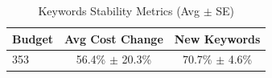 \begin{table}[htbp]
\centering
\caption{Keywords Stability Metrics (Avg $\pm$ SE)}
\begin{tabular}{lcc}
\toprule
Budget & Avg Cost Change & New Keywords \\
\midrule
353 & 56.4\% $\pm$ 20.3\% & 70.7\% $\pm$ 4.6\% \\
\bottomrule
\end{tabular}
\end{table}